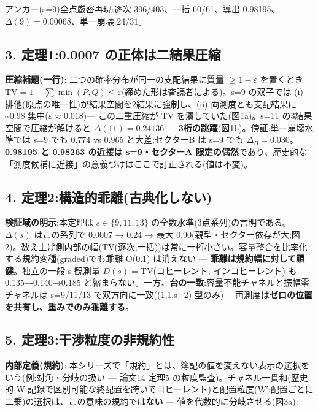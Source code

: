 \documentclass[
]{ltjsarticle}
\begin{document}
アンカー(s=9)全点厳密再現:逐次 396/403、一括 60/61、導出
0.98195、\(\Delta(9)=0.00068\)、単一崩壊 24/31。

\subsection{3. 定理1:0.0007
の正体は二結果圧縮}\label{ux5b9aux740610.0007-ux306eux6b63ux4f53ux306fux4e8cux7d50ux679cux5727ux7e2e}

\textbf{圧縮補題(一行)}: 二つの確率分布が同一の支配結果に質量
\(\ge1-\varepsilon\) を置くとき
\(\mathrm{TV}=1-\sum\min(P,Q)\le\varepsilon\)(締めた形は査読者による)。s=9
の双子では (i) 排他(原点の唯一性)が結果空間を2結果に強制し、(ii)
両測度とも支配結果に \textasciitilde0.98
集中(\(\varepsilon\approx0.018\))--- この二重圧縮が TV
を潰していた(図1a)。s=11 の3結果空間で圧縮が解けると
\(\Delta(11)=0.24136\) ---
\textbf{3桁の跳躍}(図1b)。傍証:単一崩壊水準では s=9 でも 0.774 vs 0.965
と大差;セクターB は s=9 でも \(\Delta_B=0.030\)。\textbf{0.98195 と
0.98263 の近接は s=9・セクターA
限定の偶然}であり、歴史的な「測度候補に近接」の意義づけはここで訂正される(値は不変)。

\subsection{4.
定理2:構造的乖離(古典化しない)}\label{ux5b9aux74062ux69cbux9020ux7684ux4e56ux96e2ux53e4ux5178ux5316ux3057ux306aux3044}

\textbf{検証域の明示}:本定理は \(s\in\{9,11,13\}\)
の全数水準(3点系列)の言明である。\(\Delta(s)\) はこの系列で 0.0007 →
0.24 → 最大
0.90(親型・セクター依存が大;図2)。数え上げ側内部の幅(TV(逐次,一括))は常に一桁小さい。容量整合を比率化する規約変種(graded)でも乖離
O(0.1) は消えない --- \textbf{乖離は規約幅に対して頑健}。独立の一般 s
観測量 \(D(s)=\mathrm{TV}\)(コヒーレント, インコヒーレント) も
0.135→0.140→0.185
と縮まらない。一方、\textbf{台の一致}:容量不能チャネルと振幅零チャネルは
s=9/11/13 で双方向に一致((1,1,s−2) 型のみ)---
両測度は\textbf{ゼロの位置を共有し、重みでのみ乖離する}。

\subsection{5.
定理3:干渉粒度の非規約性}\label{ux5b9aux74063ux5e72ux6e09ux7c92ux5ea6ux306eux975eux898fux7d04ux6027}

\textbf{内部定義(規約)}:
本シリーズで「規約」とは、簿記の値を変えない表示の選択をいう(例:対角・分岐の扱い
--- 論文14 定理5 の粒度監査)。チャネル一貫和(歴史的
W:記録で区別可能な終配置を跨いでコヒーレント)と配置粒度(W′:配置ごとに二乗)の選択は、この意味の規約では\textbf{ない}
--- 値を代数的に分岐させる(図3a):
\end{document}
